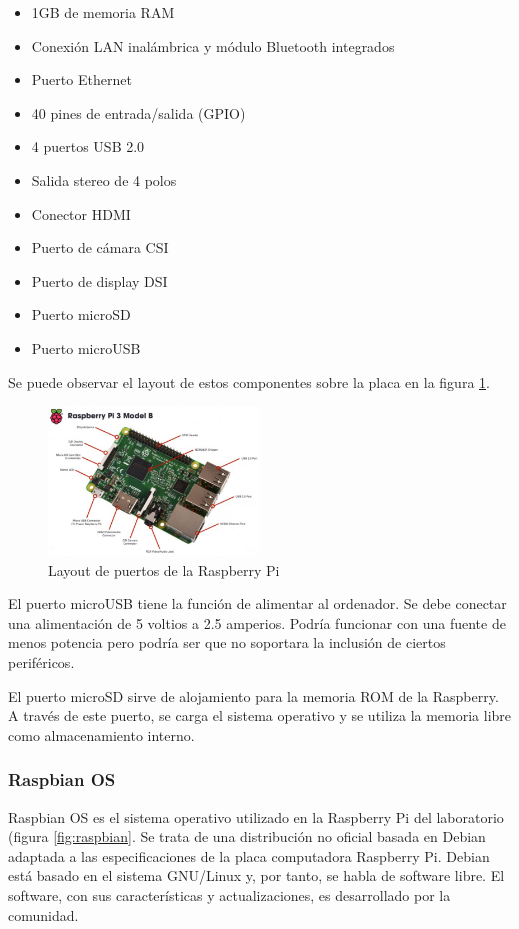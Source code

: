 \begin{itemize}
\item 1GB de memoria RAM
\item Conexión LAN inalámbrica y módulo Bluetooth integrados
\item Puerto Ethernet
\item 40 pines de entrada/salida (GPIO)
\item 4 puertos USB 2.0
\item Salida stereo de 4 polos
\item Conector HDMI
\item Puerto de cámara CSI
\item Puerto de display DSI
\item Puerto microSD
\item Puerto microUSB
\end{itemize}

Se puede observar el layout de estos componentes sobre la placa en la figura \ref{fig:RPilayout}.

\begin{figure}[tb]
\centering
\includegraphics[width=0.5\textwidth]{figuras/RPiLayout.png}
\caption{Layout de puertos de la Raspberry Pi}
\label{fig:RPilayout}
\end{figure}

El puerto microUSB tiene la función de alimentar al ordenador. Se debe conectar una alimentación de 5 voltios a 2.5 amperios. Podría funcionar con una fuente de menos potencia pero podría ser que no soportara la inclusión de ciertos periféricos.

El puerto microSD sirve de alojamiento para la memoria ROM de la Raspberry. A través de este puerto, se carga el sistema operativo y se utiliza la memoria libre como almacenamiento interno.

\subsubsection{Raspbian OS}

Raspbian OS es el sistema operativo utilizado en la Raspberry Pi del laboratorio (figura \ref{fig:raspbian}. Se trata de una distribución no oficial basada en Debian adaptada a las especificaciones de la placa computadora Raspberry Pi. Debian está basado en el sistema GNU/Linux y, por tanto, se habla de software libre. El software, con sus características y actualizaciones, es desarrollado por la comunidad.

